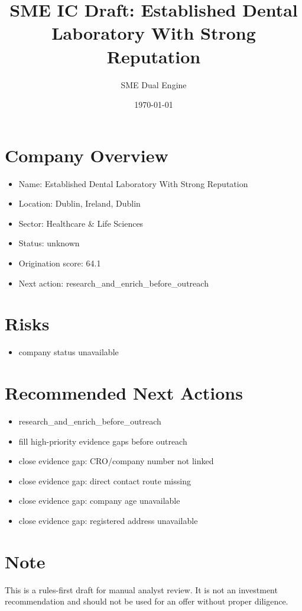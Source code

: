 \documentclass[11pt,a4paper]{article}
\title{SME IC Draft: Established Dental Laboratory With Strong Reputation}
\author{SME Dual Engine}
\date{\today}
\begin{document}
\maketitle
\section*{Company Overview}
\begin{itemize}[leftmargin=1.4em]
\item Name: Established Dental Laboratory With Strong Reputation
\item Location: Dublin, Ireland, Dublin
\item Sector: Healthcare \& Life Sciences
\item Status: unknown
\item Origination score: 64.1
\item Next action: research\_and\_enrich\_before\_outreach
\end{itemize}
\section*{Risks}
\begin{itemize}[leftmargin=1.4em]
\item company status unavailable
\end{itemize}
\section*{Recommended Next Actions}
\begin{itemize}[leftmargin=1.4em]
\item research\_and\_enrich\_before\_outreach
\item fill high-priority evidence gaps before outreach
\item close evidence gap: CRO/company number not linked
\item close evidence gap: direct contact route missing
\item close evidence gap: company age unavailable
\item close evidence gap: registered address unavailable
\end{itemize}
\section*{Note}
This is a rules-first draft for manual analyst review. It is not an investment
recommendation and should not be used for an offer without proper diligence.
\end{document}

